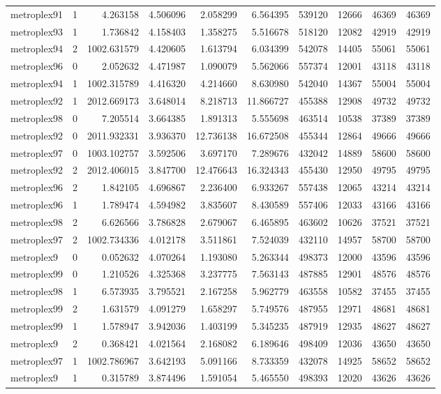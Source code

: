\begin{longtable}{|l|r|r|r|r|r|r|r|r|r|}
metroplex91 & 1 & 4.263158 & 4.506096 & 2.058299 & 6.564395 & 539120 & 12666 & 46369 & 46369 \\
metroplex93 & 1 & 1.736842 & 4.158403 & 1.358275 & 5.516678 & 518120 & 12082 & 42919 & 42919 \\
metroplex94 & 2 & 1002.631579 & 4.420605 & 1.613794 & 6.034399 & 542078 & 14405 & 55061 & 55061 \\
metroplex96 & 0 & 2.052632 & 4.471987 & 1.090079 & 5.562066 & 557374 & 12001 & 43118 & 43118 \\
metroplex94 & 1 & 1002.315789 & 4.416320 & 4.214660 & 8.630980 & 542040 & 14367 & 55004 & 55004 \\
metroplex92 & 1 & 2012.669173 & 3.648014 & 8.218713 & 11.866727 & 455388 & 12908 & 49732 & 49732 \\
metroplex98 & 0 & 7.205514 & 3.664385 & 1.891313 & 5.555698 & 463514 & 10538 & 37389 & 37389 \\
metroplex92 & 0 & 2011.932331 & 3.936370 & 12.736138 & 16.672508 & 455344 & 12864 & 49666 & 49666 \\
metroplex97 & 0 & 1003.102757 & 3.592506 & 3.697170 & 7.289676 & 432042 & 14889 & 58600 & 58600 \\
metroplex92 & 2 & 2012.406015 & 3.847700 & 12.476643 & 16.324343 & 455430 & 12950 & 49795 & 49795 \\
metroplex96 & 2 & 1.842105 & 4.696867 & 2.236400 & 6.933267 & 557438 & 12065 & 43214 & 43214 \\
metroplex96 & 1 & 1.789474 & 4.594982 & 3.835607 & 8.430589 & 557406 & 12033 & 43166 & 43166 \\
metroplex98 & 2 & 6.626566 & 3.786828 & 2.679067 & 6.465895 & 463602 & 10626 & 37521 & 37521 \\
metroplex97 & 2 & 1002.734336 & 4.012178 & 3.511861 & 7.524039 & 432110 & 14957 & 58700 & 58700 \\
metroplex9 & 0 & 0.052632 & 4.070264 & 1.193080 & 5.263344 & 498373 & 12000 & 43596 & 43596 \\
metroplex99 & 0 & 1.210526 & 4.325368 & 3.237775 & 7.563143 & 487885 & 12901 & 48576 & 48576 \\
metroplex98 & 1 & 6.573935 & 3.795521 & 2.167258 & 5.962779 & 463558 & 10582 & 37455 & 37455 \\
metroplex99 & 2 & 1.631579 & 4.091279 & 1.658297 & 5.749576 & 487955 & 12971 & 48681 & 48681 \\
metroplex99 & 1 & 1.578947 & 3.942036 & 1.403199 & 5.345235 & 487919 & 12935 & 48627 & 48627 \\
metroplex9 & 2 & 0.368421 & 4.021564 & 2.168082 & 6.189646 & 498409 & 12036 & 43650 & 43650 \\
metroplex97 & 1 & 1002.786967 & 3.642193 & 5.091166 & 8.733359 & 432078 & 14925 & 58652 & 58652 \\
metroplex9 & 1 & 0.315789 & 3.874496 & 1.591054 & 5.465550 & 498393 & 12020 & 43626 & 43626 \\
\end{longtable}
